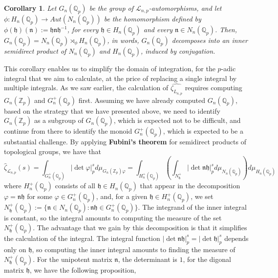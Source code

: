 \documentclass[12pt]{article}
\newtheorem{corollary}[theorem]{Corollary}
\begin{document}
\begin{corollary}
Let $G_n(\mathbb{Q}_p)$ be the group of $\mathcal{L}_{n,p}$-automorphisms, and let $\phi: H_n(\mathbb{Q}_p)\rightarrow Aut( N_n(\mathbb{Q}_p))$ be the homomorphism defined by $\phi(\mathfrak{h})(\mathfrak{n}):=\mathfrak{hn}\mathfrak{h}^{-1}$, for every $\mathfrak{h}\in  H_n(\mathbb{Q}_p)$ and every $\mathfrak{n}\in  N_n(\mathbb{Q}_p)$. Then, $G_n(\mathbb{Q}_p)= N_n(\mathbb{Q}_p)\rtimes_{\phi} H_n(\mathbb{Q}_p)$, in words, $G_n(\mathbb{Q}_p)$ decomposes into an inner semidirect product of $N_n(\mathbb{Q}_p)$ and $ H_n(\mathbb{Q}_p)$, induced by conjugation.
\end{corollary}
This corollary enables us to simplify the domain of integration, for the $p$-adic integral that we aim to calculate, at the price of replacing a single integral by multiple integrals. As we saw earlier, the calculation of $\hat{\zeta_{L_{n,p}}}$ requires computing $G_n(\mathbb{Z}_p)$ and $G_n^+(\mathbb{Q}_p)$ first. Assuming we have already computed $G_n(\mathbb{Q}_p)$, based on the strategy that we have presented above, we need to identify $G_n(\mathbb{Z}_p)$ as a subgroup of $G_n(\mathbb{Q}_p)$, which is expected not to be difficult, and continue from there to identify the monoid $G_n^+(\mathbb{Q}_p)$, which is expected to be a substantial challenge. By applying \textbf{Fubini's theorem} for semidirect products of topological groups, we have that \[\hat\zeta_{\mathcal{L}_{n,p}}(s)=\displaystyle\int_{G_n^+(\mathbb{Q}_p)}|\det\varphi|_p^sd\mu_{G_n(\mathbb{Z}_p)\varphi}=\displaystyle\int_{ H_n^+(\mathbb{Q}_p)}\left(\displaystyle\int_{ N_{\mathfrak{h}}^+}|\det\mathfrak{nh}|_p^sd\mu_{N_n(\mathbb{Q}_p)}\right)d\mu_{H_n(\mathbb{Q}_p)}\]
where $H_n^+(\mathbb{Q}_p)$ consists of all $\mathfrak{h}\in H_n(\mathbb{Q}_p)$ that appear in the decomposition $\varphi=\mathfrak{nh}$ for some $\varphi\in G_n^+(\mathbb{Q}_p)$, and, for a given $\mathfrak{h}\in H_n^+(\mathbb{Q}_p)$, we set $N_\mathfrak{h}^+(\mathbb{Q}_p):=\{\mathfrak{n}\in N_n(\mathbb{Q}_p) : \mathfrak{nh}\in G_n^+(\mathbb{Q}_p)\}$. The integrand of the inner integral is constant, so the integral amounts to computing the measure of the set $N_{\mathfrak{h}}^+(\mathbb{Q}_p)$. The advantage that we gain by this decomposition is that it simplifies the calculation of the integral. The integral function $|\det\mathfrak{nh}|_p^s=|\det\mathfrak{h}|_p^s$ depends only on $\mathfrak{h}$, so computing the inner integral amounts to finding the measure of $N_{\mathfrak{h}}^+(\mathbb{Q}_p)$. For the unipotent matrix $\mathfrak{n}$, the determinant is $1$, for the digonal matrix $\mathfrak{h}$, we have the following proposition,
\end{document}
